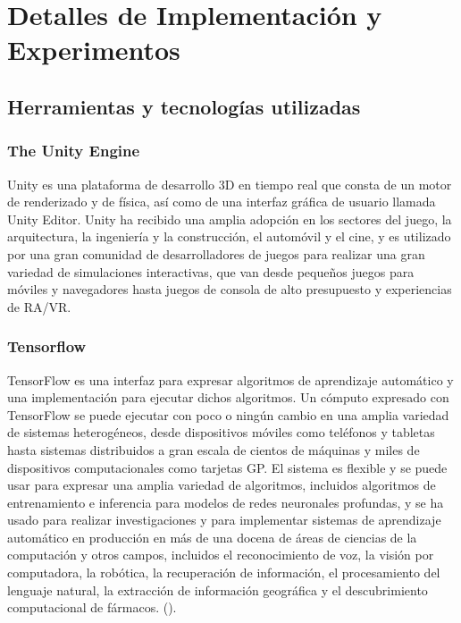 \chapter{Detalles de Implementación y Experimentos}\label{chapter:implementation}
 
\section{Herramientas y tecnologías utilizadas}
 
\subsection{The Unity Engine}
 
Unity es una plataforma de desarrollo 3D en tiempo real que consta de un motor de renderizado y de física, así como de una interfaz gráfica de usuario llamada Unity Editor. Unity ha recibido una amplia adopción en los sectores del juego, la arquitectura, la ingeniería y la construcción, el automóvil y el cine, y es utilizado por una gran comunidad de desarrolladores de juegos para realizar una gran variedad de simulaciones interactivas, que van desde pequeños juegos para móviles y navegadores hasta juegos de consola de alto presupuesto y experiencias de RA/VR.
 
\subsection{Tensorflow}
 
TensorFlow es una interfaz para expresar algoritmos de aprendizaje automático y una implementación para ejecutar dichos algoritmos. Un cómputo expresado con TensorFlow se puede ejecutar con poco o ningún cambio en una amplia variedad de sistemas heterogéneos, desde dispositivos móviles como teléfonos y tabletas hasta sistemas distribuidos a gran escala de cientos de máquinas y miles de dispositivos computacionales como tarjetas GP. El sistema es flexible y se puede usar para expresar una amplia variedad de algoritmos, incluidos algoritmos de entrenamiento e inferencia para modelos de redes neuronales profundas, y se ha usado para realizar investigaciones y para implementar sistemas de aprendizaje automático en producción en más de una docena de áreas de ciencias de la computación y otros campos, incluidos el reconocimiento de voz, la visión por computadora, la robótica, la recuperación de información, el procesamiento del lenguaje natural, la extracción de información geográfica y el descubrimiento computacional de fármacos. (\cite{tensorflow2015-whitepaper}).
 
